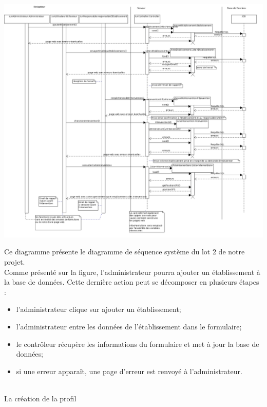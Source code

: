\includegraphics[scale=0.34]{images/diagrammeSequenceSysteme/diagrammeSequence.png}

Ce diagramme présente le diagramme de séquence système du lot 2 de notre projet. \\
Comme présenté sur la figure, l'administrateur pourra ajouter un établissement à la base de données. Cette dernière action peut se décomposer en plusieurs étapes : 
\begin{itemize}
	\item l'administrateur clique sur ajouter un établissement;
	\item l'administrateur entre les données de l'établissement dans le formulaire;
	\item le contrôleur récupère les informations du formulaire et met à jour la base de données;
	\item si une erreur apparaît, une page d'erreur est renvoyé à l'administrateur.
\end{itemize}

\\
La création de la profil 